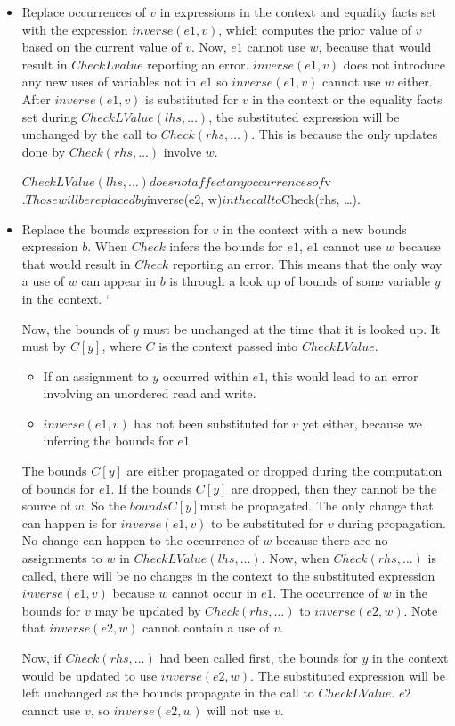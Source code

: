 \begin{itemize}
\item Replace occurrences of $v$ in expressions in the context and equality facts set with the
expression $inverse(e1, v)$, which computes the prior value of $v$ based on the current value of $v$. 
Now, $e1$ cannot use $w$, because that would result in $CheckLvalue$ reporting an error.  
$inverse(e1, v)$ does 
not introduce any new uses of variables not in $e1$ so $inverse(e1, v)$ cannot use $w$ either.   After $inverse(e1, v)$ is substituted for $v$ in the context
or the equality facts set during $CheckLValue(lhs, \ldots)$, the substituted expression will be
unchanged by the call to $Check(rhs, \ldots)$.  This is because the only updates done by 
$Check(rhs, \ldots)$ involve $w$.   

$CheckLValue(lhs, \ldots) does not affect any occurrences of $v$.  Those will be replaced 
by $inverse(e2, w)$ in the call to $Check(rhs, \ldots).

\item Replace the bounds expression for $v$ in the context with a new bounds expression $b$.
When $Check$ infers the bounds for $e1$, $e1$ cannot use $w$ because that would result in 
$Check$ reporting an error. This means that the only way a use of $w$ can appear in $b$ is
through a look up of bounds of some variable $y$ in the context.  `

Now, the bounds of  $y$ must be
unchanged at the time that it is looked up.  It must by $C[y]$, where $C$ is the context passed into
$CheckLValue$.
\begin{itemize}
\item  If an assignment to $y$ occurred within $e1$, this would lead to an error involving an unordered 
read and write.
\item $inverse(e1, v)$ has not been substituted for $v$ yet either, because we inferring the bounds for
$e1$.
\end{itemize}
The bounds $C[y]$ are  either propagated or dropped during the computation of bounds for $e1$.
If the bounds $C[y]$ are dropped, then they cannot be the source of $w$.  So the $bounds C[y]$must be propagated.  The only change that can happen is for $inverse(e1, v)$ to be substituted for $v$ during propagation.  No change can happen to the occurrence of $w$ because there are no assignments to $w$
in $CheckLValue(lhs, \ldots)$.  Now, when $Check(rhs, \ldots)$ is called, there will be no changes in the
context to the substituted expression $inverse(e1, v)$ because $w$ cannot occur in $e1$.  
The occurrence of $w$ in the bounds for $v$ may be updated by $Check(rhs, \ldots)$ to $inverse(e2, w)$.
Note that $inverse(e2, w)$ cannot contain a use of $v$.

Now, if $Check(rhs, \ldots)$ had been called first, the bounds for $y$ in the context would be updated to use
$inverse(e2, w)$.  The substituted expression will be left unchanged as the bounds propagate
in the call to $CheckLValue$.  $e2$ cannot use $v$, so $inverse(e2, w)$ will not use $v$.
\end{itemize}

